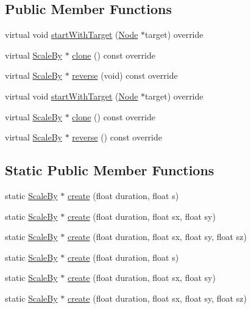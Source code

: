 \subsection*{Public Member Functions}
\begin{DoxyCompactItemize}
\item 
virtual void \hyperlink{classScaleBy_a1212167a4e86b3a8087e72602698d50e}{start\+With\+Target} (\hyperlink{classNode}{Node} $\ast$target) override
\item 
virtual \hyperlink{classScaleBy}{Scale\+By} $\ast$ \hyperlink{classScaleBy_a70d07c840c1ad6582695497afe970446}{clone} () const override
\item 
virtual \hyperlink{classScaleBy}{Scale\+By} $\ast$ \hyperlink{classScaleBy_a67a91333721ef688c63e20871e4d982b}{reverse} (void) const override
\item 
virtual void \hyperlink{classScaleBy_a161a68e7e1e9278f6f937d67cc3d27b1}{start\+With\+Target} (\hyperlink{classNode}{Node} $\ast$target) override
\item 
virtual \hyperlink{classScaleBy}{Scale\+By} $\ast$ \hyperlink{classScaleBy_abce00bc9338d8fc1fe3a765b62947d1d}{clone} () const override
\item 
virtual \hyperlink{classScaleBy}{Scale\+By} $\ast$ \hyperlink{classScaleBy_af4eaed672c6ed4991594d6404c49c521}{reverse} () const override
\end{DoxyCompactItemize}
\subsection*{Static Public Member Functions}
\begin{DoxyCompactItemize}
\item 
static \hyperlink{classScaleBy}{Scale\+By} $\ast$ \hyperlink{classScaleBy_ad0154531b07e51d3f1100e93d74bf8c6}{create} (float duration, float s)
\item 
static \hyperlink{classScaleBy}{Scale\+By} $\ast$ \hyperlink{classScaleBy_af904a0f8746361e433fd65384ebd3f09}{create} (float duration, float sx, float sy)
\item 
static \hyperlink{classScaleBy}{Scale\+By} $\ast$ \hyperlink{classScaleBy_a14f350fafd6527ac202e14b2ae7dd86c}{create} (float duration, float sx, float sy, float sz)
\item 
static \hyperlink{classScaleBy}{Scale\+By} $\ast$ \hyperlink{classScaleBy_ad901a8adb3ee884152a93589941bce5f}{create} (float duration, float s)
\item 
static \hyperlink{classScaleBy}{Scale\+By} $\ast$ \hyperlink{classScaleBy_a2003596989a80e1e6e995088d8c5a617}{create} (float duration, float sx, float sy)
\item 
static \hyperlink{classScaleBy}{Scale\+By} $\ast$ \hyperlink{classScaleBy_a790b67db78c4b36924984badf37d1ec4}{create} (float duration, float sx, float sy, float sz)
\end{DoxyCompactItemize}
